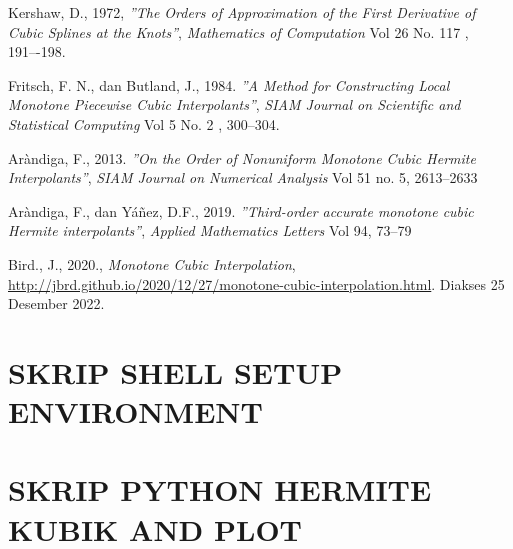 \documentclass{skripsimathugm}
\begin{document}
\begin{thebibliography}{99}
Kershaw, D., 1972, \emph{''The Orders of Approximation of the First Derivative of Cubic Splines at the Knots''}, \emph{Mathematics of Computation} Vol 26 No. 117 , 191–-198.

Fritsch, F. N., dan Butland, J., 1984. \emph{''A Method for Constructing Local Monotone
Piecewise Cubic Interpolants''}, \emph{SIAM Journal on Scientific and Statistical Computing} Vol 5 No. 2 , 300--304.

Aràndiga, F., 2013.
\emph{''On the Order of Nonuniform Monotone Cubic Hermite Interpolants''},
\emph{SIAM Journal on Numerical Analysis} Vol 51 no. 5, 2613--2633

Aràndiga, F., dan Yáñez, D.F., 2019.
\emph{''Third-order accurate monotone cubic Hermite interpolants''},
\emph{Applied Mathematics Letters} Vol 94, 73--79

Bird., J., 2020., \emph{Monotone Cubic Interpolation},\\\href{http://jbrd.github.io/2020/12/27/monotone-cubic-interpolation.html}
{\mbox{http://jbrd.github.io/2020/12/27/monotone-cubic-interpolation.html}}. Diakses 25 Desember 2022.


\end{thebibliography}


\appendix

\chapter{SKRIP SHELL SETUP ENVIRONMENT}
\lstset{frame=single}
\lstset{numbers=left, numberstyle=\tiny, stepnumber=1, numbersep=5pt, basicstyle=\footnotesize}


\chapter{SKRIP PYTHON HERMITE KUBIK AND PLOT}
\lstset{language=python, frame=single}
\lstset{numbers=left, numberstyle=\tiny, stepnumber=1, numbersep=5pt, basicstyle=\footnotesize}

\end{document}
